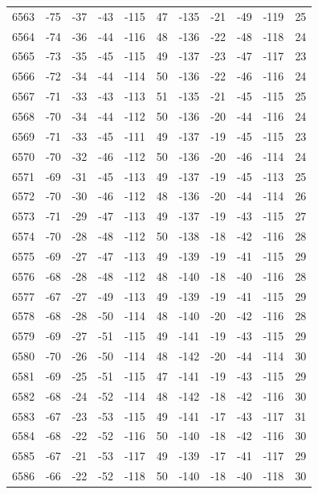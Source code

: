 \begin{table}[H]
\begin{tabular}{lllllllllll}
6563 & -75 & -37 & -43 & -115 & 47 & -135 & -21 & -49 & -119 & 25 \\
6564 & -74 & -36 & -44 & -116 & 48 & -136 & -22 & -48 & -118 & 24 \\
6565 & -73 & -35 & -45 & -115 & 49 & -137 & -23 & -47 & -117 & 23 \\
6566 & -72 & -34 & -44 & -114 & 50 & -136 & -22 & -46 & -116 & 24 \\
6567 & -71 & -33 & -43 & -113 & 51 & -135 & -21 & -45 & -115 & 25 \\
6568 & -70 & -34 & -44 & -112 & 50 & -136 & -20 & -44 & -116 & 24 \\
6569 & -71 & -33 & -45 & -111 & 49 & -137 & -19 & -45 & -115 & 23 \\
6570 & -70 & -32 & -46 & -112 & 50 & -136 & -20 & -46 & -114 & 24 \\
6571 & -69 & -31 & -45 & -113 & 49 & -137 & -19 & -45 & -113 & 25 \\
6572 & -70 & -30 & -46 & -112 & 48 & -136 & -20 & -44 & -114 & 26 \\
6573 & -71 & -29 & -47 & -113 & 49 & -137 & -19 & -43 & -115 & 27 \\
6574 & -70 & -28 & -48 & -112 & 50 & -138 & -18 & -42 & -116 & 28 \\
6575 & -69 & -27 & -47 & -113 & 49 & -139 & -19 & -41 & -115 & 29 \\
6576 & -68 & -28 & -48 & -112 & 48 & -140 & -18 & -40 & -116 & 28 \\
6577 & -67 & -27 & -49 & -113 & 49 & -139 & -19 & -41 & -115 & 29 \\
6578 & -68 & -28 & -50 & -114 & 48 & -140 & -20 & -42 & -116 & 28 \\
6579 & -69 & -27 & -51 & -115 & 49 & -141 & -19 & -43 & -115 & 29 \\
6580 & -70 & -26 & -50 & -114 & 48 & -142 & -20 & -44 & -114 & 30 \\
6581 & -69 & -25 & -51 & -115 & 47 & -141 & -19 & -43 & -115 & 29 \\
6582 & -68 & -24 & -52 & -114 & 48 & -142 & -18 & -42 & -116 & 30 \\
6583 & -67 & -23 & -53 & -115 & 49 & -141 & -17 & -43 & -117 & 31 \\
6584 & -68 & -22 & -52 & -116 & 50 & -140 & -18 & -42 & -116 & 30 \\
6585 & -67 & -21 & -53 & -117 & 49 & -139 & -17 & -41 & -117 & 29 \\
6586 & -66 & -22 & -52 & -118 & 50 & -140 & -18 & -40 & -118 & 30 \\

\end{tabular}
\end{table}
